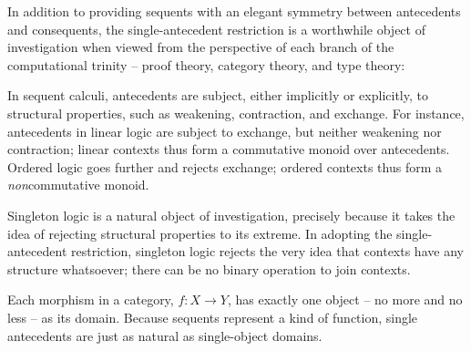 In addition to providing sequents with an elegant symmetry between antecedents and consequents, the single-antecedent restriction is a worthwhile object of investigation when viewed from the perspective of each branch of the computational trinity\autocite{Harper:ET11} -- proof theory, category theory, and type theory:
%
\begin{description}[parsep=0pt, listparindent=\parindent]
\item[Proof theory]
  In sequent calculi, antecedents are subject, either implicitly or explicitly, to structural properties, such as weakening, contraction, and exchange.
  For instance, antecedents in linear logic are subject to exchange, but neither weakening nor contraction; linear contexts thus form a commutative monoid over antecedents.
  Ordered logic goes further and rejects exchange; ordered contexts thus form a \emph{non}\-commutative monoid.


  Singleton logic is a natural object of investigation, precisely because it takes the idea of rejecting structural properties to its extreme.
  In adopting the single-antecedent restriction, singleton logic rejects the very idea that contexts have any structure whatsoever; there can be no binary operation to join contexts.

\item[Category theory]
  Each morphism in a category, $f\colon X \rightarrow Y$, has exactly one object -- no more and no less -- as its domain.
  Because sequents represent a kind of function, single antecedents are just as natural as single-object domains.


\end{description}
